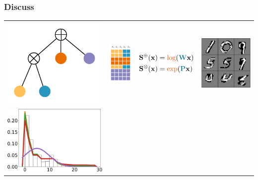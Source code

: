 \documentclass[xcolor={usenames,dvipsnames,svgnames}, compress]{beamer}
\begin{document}
\begin{frame}
  \frametitle{Discuss}
\footnotesize
\begin{table}
  \setlength{\tabcolsep}{3pt}
    \centering
    \begin{tabular}{cccc}
      \includegraphics[width=0.2\linewidth]{figures/learnspn-2}&\includegraphics[width=0.15\linewidth]{figures/grid-2}&    $
                                                                                                                        \begin{aligned}
                                                                                                                             \mathbf{S}^{\oplus}(\mathbf{x}) &=
                                     {\color{gold6}\log}({\color{petroil4}\mathbf{W}}\mathbf{x})\\                                                                       \mathbf{S}^{\otimes}(\mathbf{x}) &= {\color{gold6}\exp}({\color{petroil4}\mathbf{P}}\mathbf{x})                                         
                                                                                                                        \end{aligned}
$
&\includegraphics[width=0.2\columnwidth]
    {figures/bmnist-mpe-iii}\\
      \includegraphics[width=0.25\columnwidth]{figures/australian-2-crop-7}&

\end{tabular}
\end{table}
\end{frame}
\end{document}

